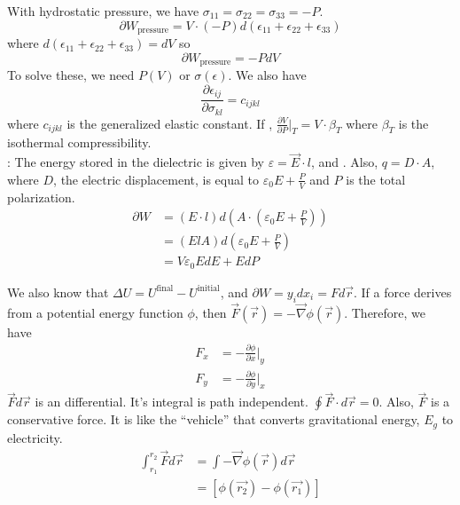 \documentclass[12pt]{article}
\begin{document}
With hydrostatic pressure, we have $\sigma_{11}=\sigma_{22}=\sigma_{33}=-P$.
\begin{equation}
\partial W_\text{pressure} = V \cdot (-P) d(\epsilon_{11} + \epsilon_{22}+\epsilon_{33})
\end{equation}
where $d(\epsilon_{11} + \epsilon_{22}+\epsilon_{33}) = dV$ so 
\begin{equation}
\partial W_\text{pressure} = -P dV
\end{equation}
To solve these, we need $P(V)$ or $\sigma(\epsilon)$.  We also have
\begin{equation}
\frac{\partial \epsilon_{ij}}{\partial \sigma_{kl}} = c_{ijkl}
\end{equation}
where $c_{ijkl}$ is the generalized elastic constant.  If , $\frac{\partial V}{\partial P}|_T = V \cdot \beta_T$ where $\beta_T$ is the isothermal compressibility.\\

: The energy stored in the dielectric is given by $\varepsilon = \vec{E}\cdot l$, and .  Also, $q=D \cdot A$, where $D$, the electric displacement, is equal to $\varepsilon_0 E + \frac{P}{V}$ and $P$ is the total polarization.
\begin{align*}
\partial W &= (E\cdot l ) d(A \cdot (\varepsilon_0 E + \frac{P}{V}))\\
&= (ElA) d(\varepsilon_0 E + \frac{P}{V})\\
&= V \varepsilon_0 E dE + E dP
\end{align*}

We also know that $\Delta U = U^\text{final} - U^\text{initial}$, and $\partial W = y_i dx_i = F d\vec{r}$.  If a force derives from a potential energy function $\phi$, then $\vec{F}(\vec{r}) = -\vec{\nabla}\phi(\vec{r})$.  Therefore, we have
\begin{align*}
F_x &= -\frac{\partial \phi}{\partial x}|_y \\
F_y &= -\frac{\partial \phi}{\partial y}|_x
\end{align*}
$\vec{F}d\vec{r}$ is an  differential.  It's integral is path independent.  $\oint \vec{F} \cdot d\vec{r} = 0$.  Also, $\vec{F}$ is a conservative force.  It is like the ``vehicle'' that converts gravitational energy, $E_g$ to electricity.
\begin{align*}
\int_{r_1}^{r_2} \vec{F} d\vec{r} &= \int - \vec{\nabla} \phi(\vec{r})d\vec{r}\\
&= [\phi(\vec{r_2}) - \phi(\vec{r_1})]
\end{align*}
\end{document}
